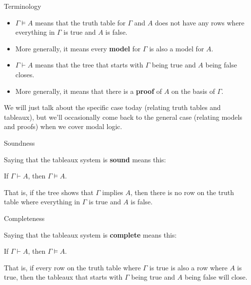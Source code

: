 \documentclass[
  ignorenonframetext,
]{beamer}
\providecommand{\tightlist}{%
  \setlength{\itemsep}{0pt}\setlength{\parskip}{0pt}}
\renewcommand{\,}{\text{, }}
\renewenvironment*{quote}	
	{\list{}{\rightmargin   \leftmargin} \item } 	
	{\endlist }
\begin{document}
\begin{frame}{Terminology}
\protect\hypertarget{terminology}{}

\begin{itemize}
\tightlist
\item
  \(\Gamma \vDash A\) means that the truth table for \(\Gamma\) and
  \(A\) does not have any rows where everything in \(\Gamma\) is true
  and \(A\) is false.
\item
  More generally, it means every \textbf{model} for \(\Gamma\) is also a
  model for \(A\). \pause
\item
  \(\Gamma \vdash A\) means that the tree that starts with \(\Gamma\)
  being true and \(A\) being false closes.
\item
  More generally, it means that there is a \textbf{proof} of \(A\) on
  the basis of \(\Gamma\). \pause
\end{itemize}

We will just talk about the specific case today (relating truth tables
and tableaux), but we'll occasionally come back to the general case
(relating models and proofs) when we cover modal logic.

\end{frame}

\begin{frame}{Soundness}
\protect\hypertarget{soundness}{}

Saying that the tableaux system is \textbf{sound} means this:

\begin{quote}
If \(\Gamma \vdash A\), then \(\Gamma \vDash A\).
\end{quote}

That is, if the tree shows that \(\Gamma\) implies \(A\), then there is
no row on the truth table where everything in \(\Gamma\) is true and
\(A\) is false.

\end{frame}

\begin{frame}{Completeness}
\protect\hypertarget{completeness}{}

Saying that the tableaux system is \textbf{complete} means this:

\begin{quote}
If \(\Gamma \vdash A\), then \(\Gamma \vDash A\).
\end{quote}

That is, if every row on the truth table where \(\Gamma\) is true is
also a row where \(A\) is true, then the tableaux that starts with
\(\Gamma\) being true and \(A\) being false will close.

\end{frame}
\end{document}
